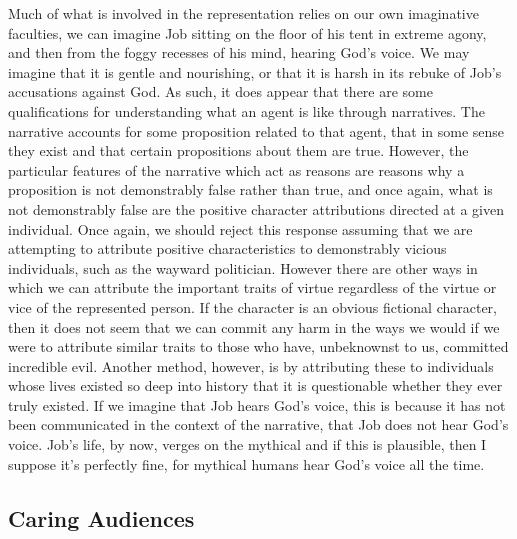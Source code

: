 \documentclass[
  letterpaper,
  DIV=11,
  numbers=noendperiod]{scrartcl}
\theoremstyle{remark}
\begin{document}
Much of what is involved in the representation relies on our own
imaginative faculties, we can imagine Job sitting on the floor of his
tent in extreme agony, and then from the foggy recesses of his mind,
hearing God's voice. We may imagine that it is gentle and nourishing, or
that it is harsh in its rebuke of Job's accusations against God. As
such, it does appear that there are some qualifications for
understanding what an agent is like through narratives. The narrative
accounts for some proposition related to that agent, that in some sense
they exist and that certain propositions about them are true. However,
the particular features of the narrative which act as reasons are
reasons why a proposition is not demonstrably false rather than true,
and once again, what is not demonstrably false are the positive
character attributions directed at a given individual. Once again, we
should reject this response assuming that we are attempting to attribute
positive characteristics to demonstrably vicious individuals, such as
the wayward politician. However there are other ways in which we can
attribute the important traits of virtue regardless of the virtue or
vice of the represented person. If the character is an obvious fictional
character, then it does not seem that we can commit any harm in the ways
we would if we were to attribute similar traits to those who have,
unbeknownst to us, committed incredible evil. Another method, however,
is by attributing these to individuals whose lives existed so deep into
history that it is questionable whether they ever truly existed. If we
imagine that Job hears God's voice, this is because it has not been
communicated in the context of the narrative, that Job does not hear
God's voice. Job's life, by now, verges on the mythical and if this is
plausible, then I suppose it's perfectly fine, for mythical humans hear
God's voice all the time.

\subsection{Caring Audiences}\label{caring-audiences}
\end{document}
